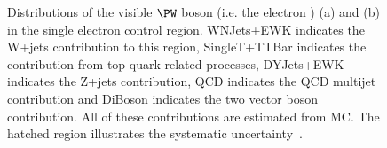 \begin{figure}
  \caption{Distributions of the visible $\PW$ boson \pt (i.e. the electron \pt) (a) and \METnoMU (b) in the single electron control region. WNJets+EWK indicates the W+jets contribution to this region, SingleT+TTBar indicates the contribution from top quark related processes, DYJets+EWK indicates the Z+jets contribution, \ac{QCD} indicates the \ac{QCD} multijet contribution and DiBoson indicates the two vector boson contribution. All of these contributions are estimated from \ac{MC}. The hatched region illustrates the systematic uncertainty~\cite{ARTICLE:CMSAN-12-403}.}
  \label{fig:promptwenu}
\end{figure}

